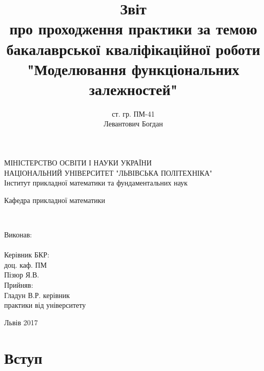 \documentclass[ukrainian,14pt]{extarticle}
\begin{document}
\title{
	Звіт \\
	про проходження практики за темою \\
	бакалаврської кваліфікаційної роботи\\
    "Моделювання функціональних залежностей"
}
\author{ст. гр. ПМ-41 \\  Левантович Богдан}

\makeatletter
\begin{titlepage}
        \centering
	МІНІСТЕРСТВО ОСВІТИ І НАУКИ УКРАЇНИ \\
	НАЦІОНАЛЬНИЙ УНІВЕРСИТЕТ "ЛЬВІВСЬКА ПОЛІТЕХНІКА" \\
	Інститут прикладної математики та фундаментальних наук\\
	\vspace{20pt}
	
	\begin{flushright}
	Кафедра прикладної математики
	\end{flushright}

	\centering
	\vspace{\fill}

	\@title \\
	\vspace{120pt}
	\raggedright
        \setlength{\leftskip}{11cm}
	Виконав:\\
	\@author\\
        Керівник БКР:\\
        доц. каф. ПМ \\
        Пізюр Я.В.\\
	Прийняв: \\
	Гладун В.Р. керівник \\
	практики від університету\\
        \setlength{\leftskip}{0cm}
	\vspace{110pt}
	\centering


	Львів 2017
\end{titlepage}
\makeatother

\setcounter{page}{2}
\tableofcontents

\newpage


\section*{Вступ}


\end{document}
